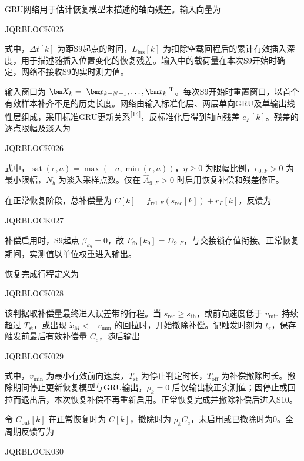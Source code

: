 GRU网络用于估计恢复模型未描述的轴向残差。输入向量为


JQRBLOCK025


式中，$\Delta t[k]$ 为距S9起点的时间，$L_{\mathrm{ins}}[k]$ 为扣除空载回程后的累计有效插入深度，用于描述随插入位置变化的恢复残差。输入中的载荷量在本次S9开始时确定，网络不接收S9的实时测力值。





输入窗口为 $\bm X_k=[\bm x_{k-N+1},\ldots,\bm x_k]^{\rm T}$。每次S9开始时重置窗口，以首个有效样本补齐不足的历史长度。网络由输入标准化层、两层单向GRU及单输出线性层组成，采用标准GRU更新关系\textsuperscript{[14]}，反标准化后得到轴向残差 $e_F[k]$。残差的逐点限幅及淡入为


JQRBLOCK026


式中，$\operatorname{sat}(e,a)=\max(-a,\min(e,a))$，$\eta\ge0$ 为限幅比例，$e_{0,F}>0$ 为最小限幅，$N_b$ 为淡入采样点数。仅在 $\widehat A_{9,F}>0$ 时启用恢复补偿和残差修正。





在正常恢复阶段，总补偿量为 $C[k]=f_{\mathrm{rel},F}(s_{\mathrm{rec}}[k])+r_F[k]$，反馈为


JQRBLOCK027


补偿启用时，S9起点 $\beta_{k_9}=0$，故 $F_{\mathrm{fb}}[k_9]=\widehat D_{9,F}$，与交接锁存值衔接。正常恢复期间，实测值以单位权重进入输出。





恢复完成行程定义为


JQRBLOCK028


该判据取补偿量最终进入误差带的行程。当 $s_{\mathrm{rec}}\ge s_{\mathrm{th}}$，或前向速度低于 $v_{\min}$ 持续超过 $T_{\mathrm{st}}$，或出现 $\dot x_M<-v_{\min}$ 的回拉时，开始撤除补偿。记触发时刻为 $t_e$，保存触发前最后有效补偿量 $C_e$，随后输出


JQRBLOCK029


式中，$v_{\min}$ 为最小有效前向速度，$T_{\mathrm{st}}$ 为停止判定时长，$T_{\mathrm{off}}$ 为补偿撤除时长。撤除期间停止更新恢复模型与GRU输出，$\rho_k=0$ 后仅输出校正实测值；因停止或回拉而退出后，本次恢复补偿不再重新启用。正常恢复完成并撤除补偿后进入S10。





令 $C_{\mathrm{out}}[k]$ 在正常恢复时为 $C[k]$，撤除时为 $\rho_kC_e$，未启用或已撤除时为0。全周期反馈写为


JQRBLOCK030


